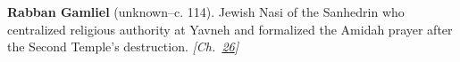 \textbf{Rabban Gamliel} (unknown–c. 114). Jewish Nasi of the Sanhedrin who centralized religious authority at Yavneh and formalized the Amidah prayer after the Second Temple's destruction. \emph{[Ch.~\hyperref[ch:jewishcalendar]{26}]}

